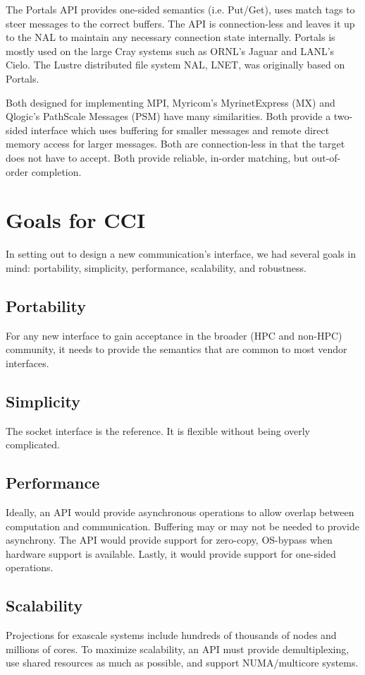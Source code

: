 \documentclass[conference]{IEEEtran}
\begin{document}
The Portals API provides one-sided semantics (i.e.  Put/Get), uses match tags to steer
messages to the correct buffers. The API is connection-less and leaves it up to the NAL to
maintain any necessary connection state internally. Portals is mostly used on the large
Cray systems such as ORNL's Jaguar\cite{jaguar} and LANL's Cielo\cite{cielo}.  The
Lustre distributed file system NAL, LNET, was originally based on Portals\cite{lnet}.

Both designed for implementing MPI, Myricom's MyrinetExpress (MX) and Qlogic's PathScale
Messages (PSM) have many similarities. Both provide a two-sided interface which uses
buffering for smaller messages and remote direct memory access for larger messages.  Both
are connection-less in that the target does not have to accept.  Both provide reliable,
in-order matching, but out-of-order completion.

\section{Goals for CCI}
In setting out to design a new communication's interface, we had several goals in mind:
portability, simplicity, performance, scalability, and robustness.

\subsection{Portability}
For any new interface to gain acceptance in the broader (HPC and non-HPC) community, it
needs to provide the semantics that are common to most vendor interfaces.

\subsection{Simplicity}
The socket interface is the reference. It is flexible without being overly
complicated.

\subsection{Performance}
Ideally, an API would provide asynchronous operations to allow overlap between computation
and communication. Buffering may or may not be needed to provide asynchrony. The API would
provide support for zero-copy, OS-bypass when hardware support is available. Lastly, it
would provide support for one-sided operations.

\subsection{Scalability}
Projections for exascale systems include hundreds of thousands of nodes and millions of
cores\cite{dongarra:exascale-talk-2010}. To maximize scalability, an API must provide
demultiplexing, use shared resources as much
as possible, and support NUMA/multicore systems.
\end{document}
